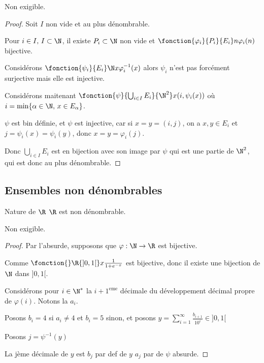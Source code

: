 Non exigible. 

\begin{proof}
    Soit $I$ non vide et au plus dénombrable.
    
    Pour $i \in I, \, I \subset \N$, il existe $P_i \subset \N$ non vide et $\fonction {\varphi_i} {P_i} {E_i} n {\varphi_i(n) }$ bijective. 

    Considérons $\fonction {\psi_i} {E_i} \N x {\varphi_i^{-1}(x)}$ alors $\psi_i$ n'est pas forcément 
    surjective mais elle est injective. 

    Considérons maitenant $\fonction {\psi} {\bigcup_{i \in I} E_i} {\N^2} x {(i, \psi_i(x))}$ où $i = \min \{ \alpha \in \N, \, x \in E_\alpha \}$.

    $\psi$ est bin définie, et $\psi$ est injective, car si $x = y = (i, j)$, 
    on a $x, y \in E_i$ et $j = \psi_i(x) = \psi_i(y)$, donc $x = y = \varphi_i(j)$.

    Donc $\displaystyle \bigcup_{i \in I} E_i$ est en bijection avec son image par $\psi$
    qui est une partie de $\N^2$, qui est donc au plus dénombrable.

\end{proof}

\subsection{Ensembles non dénombrables}

\begin{theoreme}{Nature de $\R$}{}
    $\R$ est non dénombrable.
\end{theoreme}

Non exigible. 

\begin{proof}
    Par l'absurde, supposons que $\varphi : \N \to \R$ est bijective. 

    Comme $\fonction{} \R {]0, 1[} x {\frac 1 {1 + e^{- x}}}$ est bijective, donc 
    il existe une bijection de $\N$ dans $]0, 1[$.

    Considérons pour $i \in \N^*$ la $i + 1^{\text{eme}}$ décimale du développement décimal 
    propre de $\varphi(i)$. Notons la $a_i$. 

    Posons $b_i = 4$ si $a_i \neq 4$ et $b_i = 5$ sinon, et posons $\displaystyle y = \sum_{i = 1}^\infty \frac{b_{i + 1}}{10^i} \in ]0, 1[$ 

    Posons $j = \psi^{-1}(y)$ 
    
    La jème décimale de $y$ est $b_j$ par def de $y$ 
    $a_j$ par de $\psi$ absurde. 
\end{proof}

